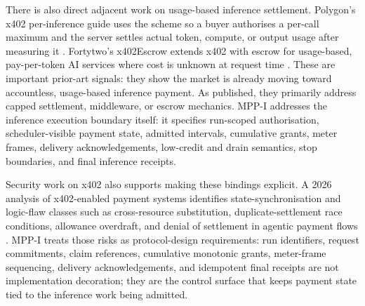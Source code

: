 \documentclass[11pt]{article}
\newcommand{\field}[1]{\texttt{\detokenize{#1}}}
\newcommand{\mppi}{MPP-I}
\begin{document}
There is also direct adjacent work on usage-based inference settlement. Polygon's x402 per-inference guide uses the \field{upto} scheme so a buyer authorises a per-call maximum and the server settles actual token, compute, or output usage after measuring it \cite{polygonInferenceBilling}. Fortytwo's x402Escrow extends x402 with escrow for usage-based, pay-per-token AI services where cost is unknown at request time \cite{fortytwoEscrow}. These are important prior-art signals: they show the market is already moving toward accountless, usage-based inference payment. As published, they primarily address capped settlement, middleware, or escrow mechanics. \mppi{} addresses the inference execution boundary itself: it specifies run-scoped authorisation, scheduler-visible payment state, admitted intervals, cumulative grants, meter frames, delivery acknowledgements, low-credit and drain semantics, stop boundaries, and final inference receipts.

Security work on x402 also supports making these bindings explicit. A 2026 analysis of x402-enabled payment systems identifies state-synchronisation and logic-flaw classes such as cross-resource substitution, duplicate-settlement race conditions, allowance overdraft, and denial of settlement in agentic payment flows \cite{x402LogicFlaws}. \mppi{} treats those risks as protocol-design requirements: run identifiers, request commitments, claim references, cumulative monotonic grants, meter-frame sequencing, delivery acknowledgements, and idempotent final receipts are not implementation decoration; they are the control surface that keeps payment state tied to the inference work being admitted.
\end{document}
